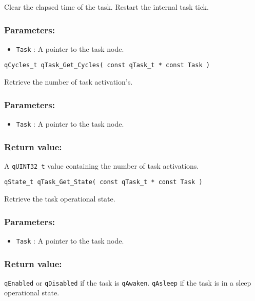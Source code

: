 Clear the elapsed time of the task. Restart the internal task tick. 

\subsubsection*{Parameters:}
\begin{itemize}
    \item \lstinline{Task} : A pointer to the task node.
\end{itemize}

\noindent\hrulefill


\begin{lstlisting}[style=CStyle]
qCycles_t qTask_Get_Cycles( const qTask_t * const Task )
\end{lstlisting}

Retrieve the number of task activation's. 

\subsubsection*{Parameters:}
\begin{itemize}
    \item \lstinline{Task} : A pointer to the task node.
\end{itemize}


\subsubsection*{Return value:}
A \lstinline{qUINT32_t} value containing the number of task activations.

\noindent\hrulefill

\begin{lstlisting}[style=CStyle]
qState_t qTask_Get_State( const qTask_t * const Task )
\end{lstlisting}

Retrieve the task operational state. 

\subsubsection*{Parameters:}
\begin{itemize}
    \item \lstinline{Task} : A pointer to the task node.
\end{itemize}

\subsubsection*{Return value:}
\lstinline{qEnabled} or \lstinline{qDisabled} if the task is \lstinline{qAwaken}. \lstinline{qAsleep} if the task is in a sleep operational state.

